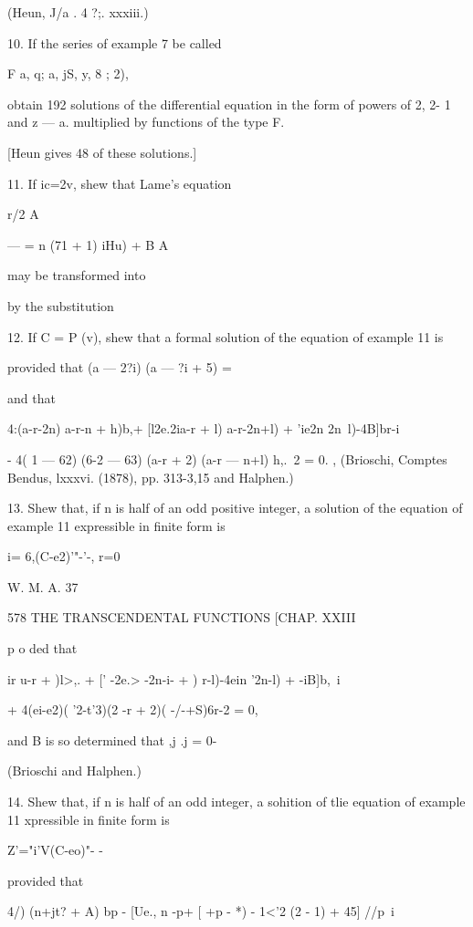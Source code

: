 {{{{{{{{(Heun, J/a . 4 ?;. xxxiii.)

10. If the series of example 7 be called

F a, q; a, jS, y, 8 ; 2),

obtain 192 solutions of the differential equation in the form of
powers of 2, 2- 1 and z — a. multiplied by functions of the type F.

[Heun gives 48 of these solutions.]

11. If ic=2v, shew that Lame's equation



r/2 A

— = n (71 + 1) iHu) + B A



may be transformed into



by the substitution

12. If C = P (v), shew that a formal solution of the equation of
example 11 is

provided that (a — 2?i) (a — ?i + 5) =

and that

4:(a-r-2n) a-r-n + h)b,+ [l2e.2ia-r + l) a-r-2n+l) + 'ie2n
2n~l)-4B]br-i

- 4( 1 — 62) (6-2 — 63) (a-r + 2) (a-r — n+l) h,.\ 2 = 0. , (Brioschi,
Comptes Bendus, lxxxvi. (1878), pp. 313-3,15 and Halphen.)

13. Shew that, if n is half of an odd positive integer, a solution of
the equation of example 11 expressible in finite form is

i= 6,(C-e2)'"-'-, r=0

W. M. A. 37



578 THE TRANSCENDENTAL FUNCTIONS [CHAP. XXIII

p o ded that

 ir u-r + )l>,. + [' -2e.> -2n-i- + ) r-l)-4ein '2n-l) + -iB]b,\ i

+ 4(ei-e2)( '2-t'3)(2 -r + 2)( -/-+S)6r-2 = 0,

and B is so determined that ,j .j = 0-

(Brioschi and Halphen.)

14. Shew that, if n is half of an odd integer, a sohition of tlie
equation of example 11 xpressible in finite form is

Z'="i'V(C-eo)"- -

provided that

4/) (n+jt? + A) bp - [Ue., n -p+ [ +p - *) - 1<'2 (2 - 1) + 45] //p\ i

}}}}}}}}

